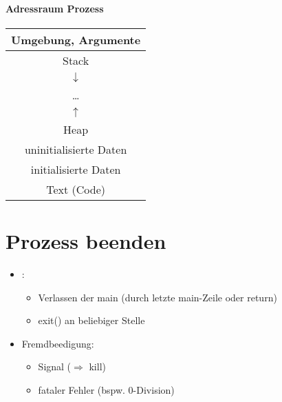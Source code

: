 \paragraph{Adressraum Prozess} \parskp
\begin{tabular}{| c |}
\hline 
Umgebung, Argumente\\
\hline 
Stack\\
$\downarrow$\\
…\\
$\uparrow$\\
Heap\\
\hline
uninitialisierte Daten\\
\hline
initialisierte Daten\\
\hline
Text (Code)\\
\hline
\end{tabular}
\section{Prozess beenden}
\begin{itemize}
\item {}:
\begin{itemize}
\item Verlassen der main (durch letzte main-Zeile oder return)
\item exit() an beliebiger Stelle
\end{itemize}
\item Fremdbeedigung:
\begin{itemize}
\item Signal ($\Rightarrow$ kill)
\item fataler Fehler (bspw. 0-Division)
\end{itemize}
\end{itemize}

